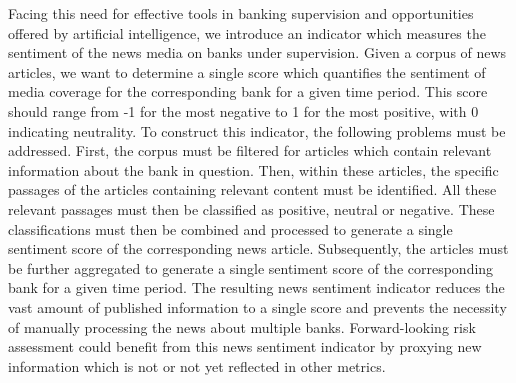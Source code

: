 Facing this need for effective tools in banking supervision and opportunities offered by artificial intelligence, we introduce an indicator which measures the sentiment of the news media on banks under supervision. Given a corpus of news articles, we want to determine a single score which quantifies the sentiment of media coverage for the corresponding bank for a given time period. This score should range from -1 for the most negative to 1 for the most positive, with 0 indicating neutrality. To construct this indicator, the following problems must be addressed. First, the corpus must be filtered for articles which contain relevant information about the bank in question. Then, within these articles, the specific passages of the articles containing relevant content must be identified. All these relevant passages must then be classified as positive, neutral or negative. These classifications must then be combined and processed to generate a single sentiment score of the corresponding news article. Subsequently, the articles must be further aggregated to generate a single sentiment score of the corresponding bank for a given time period. The resulting news sentiment indicator reduces the vast amount of published information to a single score and prevents the necessity of manually processing the news about multiple banks. Forward-looking risk assessment could benefit from this news sentiment indicator by proxying new information which is not or not yet reflected in other metrics. 

\cleardoublepage
